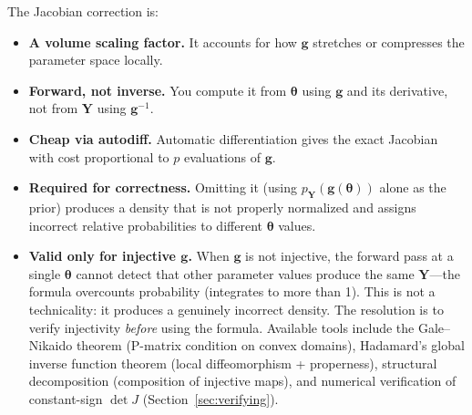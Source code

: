 \documentclass[11pt,a4paper]{article}
\theoremstyle{definition}
\newcommand{\btheta}{\boldsymbol{\theta}}
\begin{document}
\noindent
The Jacobian correction is:
\begin{itemize}
    \item \textbf{A volume scaling factor.} It accounts for how $\mathbf{g}$
    stretches or compresses the parameter space locally.

    \item \textbf{Forward, not inverse.} You compute it from $\btheta$ using
    $\mathbf{g}$ and its derivative, not from $\mathbf{Y}$ using
    $\mathbf{g}^{-1}$.

    \item \textbf{Cheap via autodiff.} Automatic differentiation gives the
    exact Jacobian with cost proportional to $p$ evaluations of $\mathbf{g}$.

    \item \textbf{Required for correctness.} Omitting it (using
    $p_{\mathbf{Y}}(\mathbf{g}(\btheta))$ alone as the prior) produces a
    density that is not properly normalized and assigns incorrect relative
    probabilities to different $\btheta$ values.

    \item \textbf{Valid only for injective $\mathbf{g}$.} When
    $\mathbf{g}$ is not injective, the forward pass at a single $\btheta$
    cannot detect that other parameter values produce the same
    $\mathbf{Y}$---the formula overcounts probability (integrates to more
    than 1). This is not a technicality: it produces a genuinely incorrect
    density. The resolution is to verify injectivity \emph{before} using the
    formula. Available tools include the Gale--Nikaido theorem (P-matrix
    condition on convex domains), Hadamard's global inverse function theorem
    (local diffeomorphism + properness), structural decomposition
    (composition of injective maps), and numerical verification of
    constant-sign $\det J$ (Section~\ref{sec:verifying}).
\end{itemize}
\end{document}
